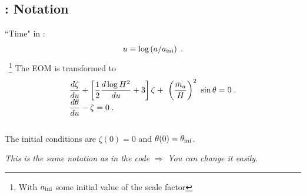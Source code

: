 \documentclass[10pt,utf8,compress,xcolor=dvipsnames]{beamer}
\begin{document}
\subsection{\mimes: Notation}
\begin{frame}{\insertsubsectionhead}
	\vspace{-0.2cm}
	
	``Time" in \mimes:
	\begin{equation*}\vspace{-0.2cm}
		u \equiv \log \lrb{a/\ai}\;.
	\end{equation*} 
	~\footnote{\fontF With $a_{\rm ini}{}$ some initial value of the scale factor}
	The EOM is transformed to
	\begin{eqnarray*}\vspace*{-0.5cm}
		& \dfrac{d  \zeta}{du} + \lrsb{\dfrac{1}{2} \dfrac{d \log H^2}{du} + 3 } \zeta + \ \lrb{\dfrac{\maT}{H}}^2 \ \sin \theta
		=0 \;. \\[-0.2cm]
		&\dfrac{d \theta}{d u} - \zeta=0 \;.
	\end{eqnarray*}\\[-0.2cm]
	The initial conditions are $\zeta(0)=0$ and $\theta(0)=\theta_{\rm ini}{}$.\\[1cm]\pause
	
	\begin{center}
		{\em This is the same notation as in the code} $\Rightarrow$ {\em You can change it easily.}
	\end{center}
	
	
\end{frame}
\end{document}

